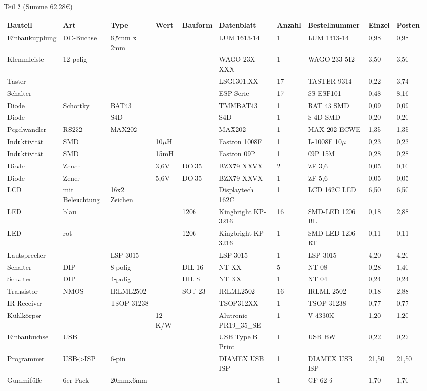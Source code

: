 \documentclass[a4paper]{article}
\begin{document}
Teil 2 (Summe 62,28\euro)


{\tiny
\begin{tabular}{llllllllll}

	\hline
	\textbf{Bauteil} & \textbf{Art} & \textbf{Type} &\textbf{Wert} &\textbf{Bauform} &\textbf{Datenblatt} &\textbf{Anzahl}  &\textbf{Bestellnummer} &\textbf{Einzel} &\textbf{Posten} \\
	\hline
	

Einbaukupplung & DC-Buchse & 6,5mm x 2mm & & & LUM 1613-14 & 1 & LUM 1613-14 & 0,98 & 0,98 \\
Klemmleiste & 12-polig & & & & WAGO 23X-XXX & 1 & WAGO 233-512 & 3,50 & 3,50 \\
Taster & & & & & LSG1301.XX & 17 & TASTER 9314 & 0,22 & 3,74 \\
Schalter & & & & & ESP Serie & 17 & SS ESP101 & 0,48 & 8,16 \\
Diode & Schottky & BAT43 & & & TMMBAT43 & 1 & BAT 43 SMD & 0,09 & 0,09 \\
Diode & & S4D & & & S4D & 1 & S 4D SMD & 0,20 & 0,20 \\
Pegelwandler & RS232 & MAX202 & & & MAX202 & 1 & MAX 202 ECWE & 1,35 & 1,35 \\
Induktivität & SMD & & 10$\mu$H & & Fastron 1008F & 1 & L-1008F 10$\mu$ & 0,23 & 0,23 \\
Induktivität & SMD & & 15mH & & Fastron 09P & 1 & 09P 15M & 0,28 & 0,28 \\
Diode & Zener	 & & 3,6V & DO-35 & BZX79-XXVX & 2 & ZF 3,6 & 0,05 & 0,10 \\
Diode & Zener & & 5,6V & DO-35 & BZX79-XXVX & 1 & ZF 5,6 & 0,05 & 0,05 \\
LCD & mit Beleuchtung & 16x2 Zeichen & & & Displaytech 162C & 1	& LCD 162C LED & 6,50 & 6,50 \\


LED & blau & & & 1206 & Kingbright KP-3216 & 16 & SMD-LED 1206 BL & 0,18 & 2,88 \\
LED & rot & & & 1206 & Kingbright KP-3216 & 1 & SMD-LED 1206 RT & 0,11 & 0,11 \\
Lautsprecher &  & LSP-3015 & & & LSP-3015 & 1 & LSP-3015 & 4,20 & 4,20 \\
Schalter & DIP & 8-polig & & DIL 16 & NT XX & 5 & NT 08 & 0,28 & 1,40 \\
Schalter & DIP & 4-polig & & DIL 8 & NT XX & 1 & NT 04 & 0,24 & 0,24 \\
Transistor & NMOS & IRLML2502 & & SOT-23 & IRLML2502 & 16 & IRLML 2502 & 0,18 & 2,88 \\
IR-Receiver &  & TSOP 31238 &  & & TSOP312XX & 1 & TSOP 31238 & 0,77 & 0,77 \\
Kühlkörper &  &  & 12 K/W &  & Alutronic PR19\_35\_SE & 1 & V 4330K & 1,20 & 1,20 \\
Einbaubuchse & USB & & & & USB Type B Print & 1 & USB BW & 0,22 & 0,22 \\

																		
Programmer & USB->ISP & 6-pin & & & DIAMEX USB ISP & 1 & DIAMEX USB ISP & 21,50 & 21,50 \\																		
Gummifüße & 6er-Pack & 20mmx6mm & & & & 1 & GF 62-6 & 1,70 & 1,70	\\

	\hline
\end{tabular}
}		
\end{document}
